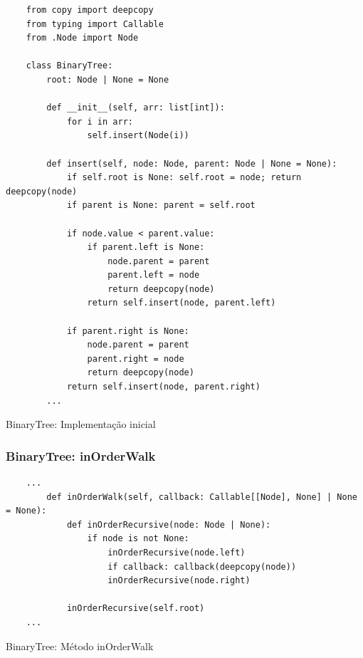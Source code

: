 \begin{listing}[H]
    \begin{verbatim}
    from copy import deepcopy
    from typing import Callable
    from .Node import Node

    class BinaryTree:
        root: Node | None = None

        def __init__(self, arr: list[int]):
            for i in arr:
                self.insert(Node(i))

        def insert(self, node: Node, parent: Node | None = None):
            if self.root is None: self.root = node; return deepcopy(node)
            if parent is None: parent = self.root

            if node.value < parent.value:
                if parent.left is None:
                    node.parent = parent
                    parent.left = node
                    return deepcopy(node)
                return self.insert(node, parent.left)
            
            if parent.right is None:
                node.parent = parent
                parent.right = node
                return deepcopy(node)
            return self.insert(node, parent.right)
        ...
    \end{verbatim}
    \caption{BinaryTree: Implementação inicial}
    \label{listing:impl-btree-ini}
\end{listing}

\subsubsection{BinaryTree: inOrderWalk}

\begin{listing}[H]
    \begin{verbatim}
    ...
        def inOrderWalk(self, callback: Callable[[Node], None] | None = None):
            def inOrderRecursive(node: Node | None):
                if node is not None:
                    inOrderRecursive(node.left)
                    if callback: callback(deepcopy(node))
                    inOrderRecursive(node.right)

            inOrderRecursive(self.root)
    ...
    \end{verbatim}
    \caption{BinaryTree: Método inOrderWalk}
    \label{listing:inOrderWalk}
\end{listing}

